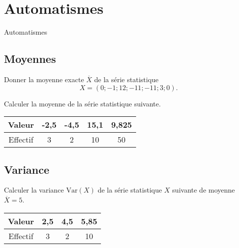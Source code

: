 \documentclass[14pt]{beamer}
\begin{document}
\section{Automatismes}

\begin{frame}

\centering \huge
Automatismes

\end{frame}

\subsection{Moyennes}

\begin{frame}{1}
	Donner la moyenne exacte $\overline{X}$ de la série statistique
		\[ X= (0 ; -1 ; 12 ; -11 ; -11 ; 3 ; 0). \]
\end{frame}

\begin{frame}{2}
	Calculer la moyenne de la série statistique suivante.
	
	\vspace{1cm}
	\centering
	\begin{tabular}{|c|c|c|c|c|}\hline
	Valeur & -2,5 & -4,5 & 15,1 & 9,825  \\ \hline
	Effectif & 3 & 2 & 10 & 50 \\ \hline
	\end{tabular}
\end{frame}

\subsection{Variance}

\begin{frame}{3}
	Calculer la variance $\text{Var}(X)$ de la série statistique $X$ suivante de moyenne $\overline{X} = 5$.
	
	\vspace{1cm}
	\centering
	\begin{tabular}{|c|c|c|c|}\hline
	Valeur & 2,5 & 4,5 & 5,85 \\ \hline
	Effectif & 3 & 2 & 10\\ \hline
	\end{tabular}	
	
\end{frame}
\end{document}
